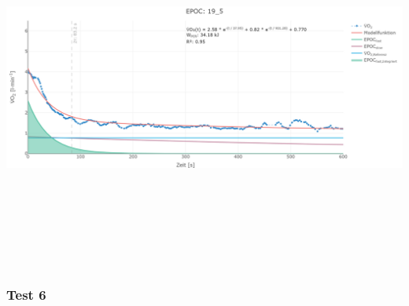 \documentclass[
  letterpaper,
  DIV=11]{scrartcl}
\begin{document}
\includegraphics[width=11.45833in,height=4.6875in]{images/19_5.png}

\subsubsection{Test 6}
\end{document}
